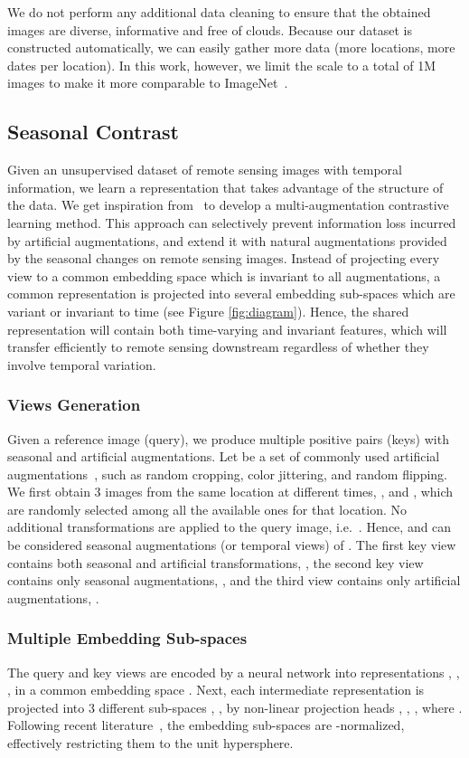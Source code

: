 \documentclass[10pt,twocolumn,letterpaper]{article}
\begin{document}
We do not perform any additional data cleaning to ensure that the obtained images are diverse, informative and free of clouds. Because our dataset is constructed automatically, we can easily gather more data (more locations, more dates per location). In this work, however, we limit the scale to a total of 1M images to make it more comparable to ImageNet~\cite{russakovsky2014imagenet}. 

\subsection{Seasonal Contrast}\label{ssec:seasonal_contrast}
Given an unsupervised dataset of remote sensing images with temporal information, we learn a representation that takes advantage of the structure of the data. We get inspiration from~\cite{xiao2020should} to develop a multi-augmentation contrastive learning method. This approach can selectively prevent information loss incurred by artificial augmentations, and extend it with natural augmentations provided by the seasonal changes on remote sensing images. Instead of projecting every view to a common embedding space which is invariant to all augmentations, a common representation is projected into several embedding sub-spaces which are variant or invariant to time (see Figure \ref{fig:diagram}). Hence, the shared representation will contain both time-varying and invariant features, which will transfer efficiently to remote sensing downstream regardless of whether they involve temporal variation.

\subsubsection{Views Generation}
Given a reference image (query), we produce multiple positive pairs (keys) with seasonal and artificial augmentations. Let  be a set of commonly used artificial augmentations~\citep{he2020momentum}, such as random cropping, color jittering, and random flipping. We first obtain 3 images from the same location at different times, ,  and , which are randomly selected among all the available ones for that location. No additional transformations are applied to the query image, i.e.\ . Hence,  and  can be considered seasonal augmentations (or temporal views) of . The first key view contains both seasonal and artificial transformations, , the second key view contains only seasonal augmentations, , and the third view contains only artificial augmentations, .

\subsubsection{Multiple Embedding Sub-spaces}
The query and key views are encoded by a neural network  into representations , , ,  in a common embedding space . Next, each intermediate representation is projected into 3 different sub-spaces , ,  by non-linear projection heads , , , where . Following recent literature~\cite{wang2020understanding}, the embedding sub-spaces are -normalized, effectively restricting them to the unit hypersphere.
\end{document}
